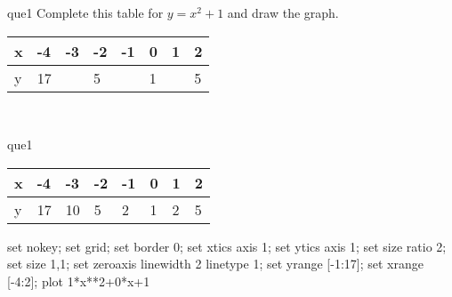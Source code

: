 \documentclass[13.5pt, varwidth=true]{beamer}
\begin{document}
\begin{frame}[shrink=19,fragile]
	\begin{beamercolorbox}[rounded=true, left, shadow=true,wd=14.8cm]{que1}
		 Complete this table for $y = x^{2} + 1$ and draw the graph. \\[0.3cm] \renewcommand{\arraystretch}{1.2}\begin{tabular}{|C|C|C|C|C|C|C|C|} \hline x & -4 & -3 & -2 & -1 & 0 & 1 & 2 \\ \hline y & 17 &  & 5 &  & 1 &  & 5\\ \hline \end{tabular}\\[0.3cm]
	\end{beamercolorbox}
\end{frame}
\begin{frame}[shrink=19,fragile]
	\begin{beamercolorbox}[rounded=true, left, shadow=true,wd=14.8cm]{que1}
		\renewcommand{\arraystretch}{1.2}\begin{tabular}{|C|C|C|C|C|C|C|C|} \hline x & -4 & -3 & -2 & -1 & 0 & 1 & 2 \\ \hline y & 17 & 10 & 5 & 2 & 1 & 2 & 5\\ \hline \end{tabular}\begin{gnuplot}[terminal=pdf] set nokey; set grid; set border 0; set xtics axis 1; set ytics axis 1; set size ratio 2; set size 1,1; set zeroaxis linewidth 2 linetype 1; set yrange [-1:17]; set xrange [-4:2]; plot 1*x**2+0*x+1 \end{gnuplot}
	\end{beamercolorbox}
\end{frame}
\end{document}
